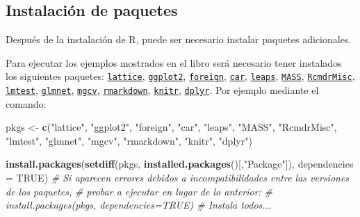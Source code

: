 \documentclass[]{book}
\newenvironment{Shaded}{\begin{snugshade}}{\end{snugshade}}
\newcommand{\KeywordTok}[1]{\textcolor[rgb]{0.13,0.29,0.53}{\textbf{#1}}}
\newcommand{\DataTypeTok}[1]{\textcolor[rgb]{0.13,0.29,0.53}{#1}}
\newcommand{\StringTok}[1]{\textcolor[rgb]{0.31,0.60,0.02}{#1}}
\newcommand{\CommentTok}[1]{\textcolor[rgb]{0.56,0.35,0.01}{\textit{#1}}}
\newcommand{\OtherTok}[1]{\textcolor[rgb]{0.56,0.35,0.01}{#1}}
\newcommand{\NormalTok}[1]{#1}
\begin{document}
\subsection{Instalación de paquetes}\label{instalacion-de-paquetes}

Después de la instalación de R, puede ser necesario instalar paquetes
adicionales.

Para ejecutar los ejemplos mostrados en el libro será necesario tener
instalados los siguientes paquetes:
\href{https://cran.r-project.org/web/packages/lattice/index.html}{\texttt{lattice}},
\href{https://cran.r-project.org/web/packages/ggplot2/index.html}{\texttt{ggplot2}},
\href{https://cran.r-project.org/web/packages/foreign/index.html}{\texttt{foreign}},
\href{https://cran.r-project.org/web/packages/car/index.html}{\texttt{car}},
\href{https://cran.r-project.org/web/packages/leaps/index.html}{\texttt{leaps}},
\href{https://cran.r-project.org/web/packages/MASS/index.html}{\texttt{MASS}},
\href{https://cran.r-project.org/web/packages/RcmdrMisc/index.html}{\texttt{RcmdrMisc}},
\href{https://cran.r-project.org/web/packages/lmtest/index.html}{\texttt{lmtest}},
\href{https://cran.r-project.org/web/packages/glmnet/index.html}{\texttt{glmnet}},
\href{https://cran.r-project.org/web/packages/mgcv/index.html}{\texttt{mgcv}},
\href{https://cran.r-project.org/web/packages/rmarkdown/index.html}{\texttt{rmarkdown}},
\href{https://cran.r-project.org/web/packages/knitr/index.html}{\texttt{knitr}},
\href{https://cran.r-project.org/web/packages/dplyr/index.html}{\texttt{dplyr}}.
Por ejemplo mediante el comando:

\begin{Shaded}
\begin{Highlighting}[]
\NormalTok{pkgs <-}\StringTok{ }\KeywordTok{c}\NormalTok{(}\StringTok{"lattice"}\NormalTok{, }\StringTok{"ggplot2"}\NormalTok{, }\StringTok{"foreign"}\NormalTok{, }\StringTok{"car"}\NormalTok{, }\StringTok{"leaps"}\NormalTok{, }\StringTok{"MASS"}\NormalTok{, }\StringTok{"RcmdrMisc"}\NormalTok{, }
          \StringTok{"lmtest"}\NormalTok{, }\StringTok{"glmnet"}\NormalTok{, }\StringTok{"mgcv"}\NormalTok{, }\StringTok{"rmarkdown"}\NormalTok{, }\StringTok{"knitr"}\NormalTok{, }\StringTok{"dplyr"}\NormalTok{)}

\KeywordTok{install.packages}\NormalTok{(}\KeywordTok{setdiff}\NormalTok{(pkgs, }\KeywordTok{installed.packages}\NormalTok{()[,}\StringTok{"Package"}\NormalTok{]), }\DataTypeTok{dependencies =} \OtherTok{TRUE}\NormalTok{)}
\CommentTok{# Si aparecen errores debidos a incompatibilidades entre las versiones de los paquetes, }
\CommentTok{# probar a ejecutar en lugar de lo anterior:}
\CommentTok{# install.packages(pkgs, dependencies=TRUE) # Instala todos...}
\end{Highlighting}
\end{Shaded}
\end{document}

